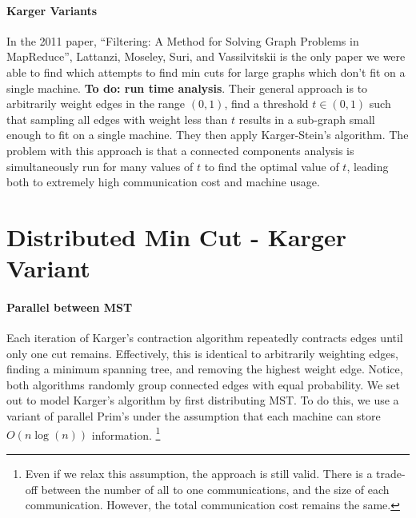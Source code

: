 \documentclass[12pt]{article}
\begin{document}
\paragraph*{Karger Variants} In the 2011 paper, ``Filtering: A Method for Solving Graph Problems in MapReduce'', Lattanzi, Moseley, Suri, and Vassilvitskii is the only paper we were able to find which attempts to find min cuts for large graphs which don't fit on a single machine. \textbf{To do: run time analysis}. Their general approach is to arbitrarily weight edges in the range $(0,1)$, find a threshold $t \in (0,1)$ such that sampling all edges with weight less than $t$ results in a sub-graph small enough to fit on a single machine. They then apply Karger-Stein's algorithm. The problem with this approach is that a connected components analysis is simultaneously run for many values of $t$ to find the optimal value of $t$, leading both to extremely high communication cost and machine usage.

\section*{Distributed Min Cut - Karger Variant}

\paragraph{Parallel between MST} Each iteration of Karger's contraction algorithm repeatedly contracts edges until only one cut remains. Effectively, this is identical to arbitrarily weighting edges, finding a minimum spanning tree, and removing the highest weight edge. Notice, both algorithms randomly group connected edges with equal probability. We set out to model Karger's algorithm by first distributing MST. To do this, we use a variant of parallel Prim's under the assumption that each machine can store $O(n \log(n))$ information. \footnote{Even if we relax this assumption, the approach is still valid. There is a trade-off between the number of all to one communications, and the size of each communication. However, the total communication cost remains the same.}
\end{document}
